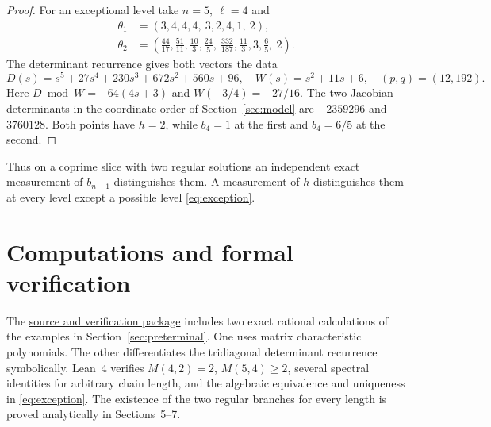 \documentclass[11pt,a4paper]{article}
\begin{document}
\begin{proof}
For an exceptional level take \(n=5,\ \ell=4\) and
\begin{align*}
 \theta_1&=(3,4,4,4,\ 3,2,4,1,\ 2),\\
 \theta_2&=\left(\tfrac{44}{17},\tfrac{51}{11},\tfrac{10}{3},\tfrac{24}{5},\
                 \tfrac{332}{187},\tfrac{11}{3},3,\tfrac65,\ 2\right).
\end{align*}
The determinant recurrence gives both vectors the data
\[
 D(s)=s^5+27s^4+230s^3+672s^2+560s+96,\quad
 W(s)=s^2+11s+6,\quad (p,q)=(12,192).
\]
Here \(D\bmod W=-64(4s+3)\) and \(W(-3/4)=-27/16\).
The two Jacobian determinants in the coordinate order of Section~\ref{sec:model}
are \(-2359296\) and \(3760128\). Both points have \(h=2\), while
\(b_4=1\) at the first and \(b_4=6/5\) at the second.
\end{proof}

Thus on a coprime slice with two regular solutions an independent exact
measurement of \(b_{n-1}\) distinguishes them. A measurement of \(h\)
distinguishes them at every level except a possible level \eqref{eq:exception}.

\section*{Computations and formal verification}
The \href{https://github.com/qqhgdkktu/catenary-identifiability/tree/global-multiplicity-v2/global-multiplicity}{source and verification package}
includes two exact rational calculations of the examples in Section~\ref{sec:preterminal}.
One uses matrix characteristic polynomials. The other differentiates the
tridiagonal determinant recurrence symbolically. Lean~4 verifies
\(M(4,2)=2\), \(M(5,4)\ge2\), several spectral identities for arbitrary
chain length, and the algebraic equivalence and uniqueness in
\eqref{eq:exception}. The existence of the two regular branches for every
length is proved analytically in Sections~5--7.
\end{document}
